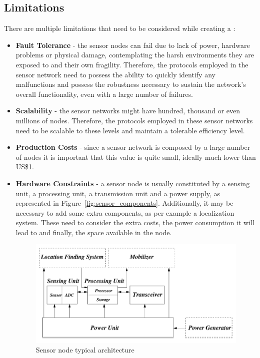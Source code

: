 \subsection{Limitations}
\label{subsec:wsn_limitations}
There are multiple limitations that need to be considered while creating a 
\cite{Akyildiz2002, Matin2012}:
\begin{itemize}
      \item \textbf{Fault Tolerance} - the sensor nodes can fail due to lack of power, hardware
            problems or physical damage, contemplating the harsh environments they are exposed to
            and their own fragility. Therefore, the protocols employed in the sensor network
            need to possess the ability to quickly identify any malfunctions and possess the
            robustness necessary to sustain the network's overall functionality, even with a large
            number of failures.
      \item \textbf{Scalability} - the sensor networks might have hundred, thousand or even
            millions of nodes. Therefore, the protocols employed in these sensor networks need to
            be scalable to these levels and maintain a tolerable efficiency level.
      \item \textbf{Production Costs} - since a sensor network is composed by a large number of
            nodes it is important that this value is quite small, ideally much lower than US\$1.
      \item \textbf{Hardware Constraints} - a sensor node is usually constituted by a sensing
            unit, a processing unit, a transmission unit and a power supply, as represented in
            Figure~\ref{fig:sensor_components}. Additionally, it may be necessary to add some
            extra components, as per example a localization system. These need to consider the
            extra costs, the power consumption it will lead to and finally, the space available
            in the node.
            \begin{figure}[H]
                  \caption{Sensor node typical architecture \cite{Akyildiz2002}}
                  \centering
                  \includegraphics[scale=1]{Chapters/Figures/sensor_components.png}

\end{figure}
\end{itemize}
